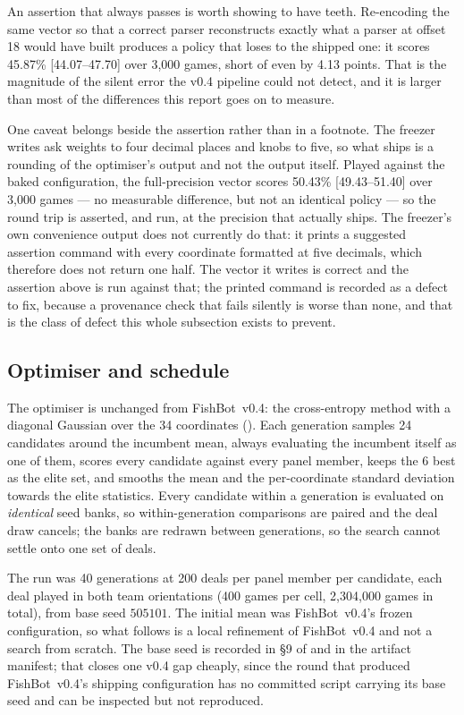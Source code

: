 \documentclass[11pt]{article}
\theoremstyle{definition}
\DeclareRobustCommand{\vfour}{\texorpdfstring{\mbox{FishBot v0.4}}{FishBot v0.4}}
\providecommand{\numFitGens}{40}
\providecommand{\numFitDims}{34}
\providecommand{\numAliasOffset}{18}
\providecommand{\numAliasWin}{45.87}
\providecommand{\numAliasCI}{44.07--47.70}
\providecommand{\numAliasLoss}{4.13}
\providecommand{\numAliasGames}{3{,}000}
\providecommand{\numQuantWin}{50.43}
\providecommand{\numQuantCI}{49.43--51.40}
\providecommand{\numQuantGames}{3{,}000}
\providecommand{\numFitPop}{24}
\providecommand{\numFitElite}{6}
\providecommand{\numFitSeed}{505101}
\providecommand{\numFitDeals}{200}
\providecommand{\numFitCellGames}{400}
\providecommand{\numFitTotalGames}{2{,}304{,}000}
\begin{document}
An assertion that always passes is worth showing to have teeth. Re-encoding the
same vector so that a correct parser reconstructs exactly what a parser at offset
\numAliasOffset{} would have built produces a policy that loses to the shipped
one: it scores \numAliasWin\% [\numAliasCI] over \numAliasGames{} games, short of
even by \numAliasLoss{} points. That is the magnitude of the silent error the
v0.4 pipeline could not detect, and it is larger than most of the differences
this report goes on to measure.

One caveat belongs beside the assertion rather than in a footnote. The freezer
writes ask weights to four decimal places and knobs to five, so what ships is a
rounding of the optimiser's output and not the output itself. Played against the
baked configuration, the full-precision vector scores \numQuantWin\%
[\numQuantCI] over \numQuantGames{} games --- no measurable difference, but not
an identical policy --- so the round trip is asserted, and run, at the precision
that actually ships. The freezer's own convenience output does not currently do
that: it prints a suggested assertion command with every coordinate formatted at
five decimals, which therefore does not return one half. The vector it writes is
correct and the assertion above is run against that; the printed command is
recorded as a defect to fix, because a provenance check that fails silently is
worse than none, and that is the class of defect this whole subsection exists to
prevent.

\subsection{Optimiser and schedule}
\label{sec:fit-cem}

The optimiser is unchanged from \vfour{}: the cross-entropy method with a
diagonal Gaussian over the \numFitDims{} coordinates
(). Each generation samples \numFitPop{}
candidates around the incumbent mean, always evaluating the incumbent itself as
one of them, scores every candidate against every panel member, keeps the
\numFitElite{} best as the elite set, and smooths the mean and the
per-coordinate standard deviation towards the elite statistics. Every candidate
within a generation is evaluated on \emph{identical} seed banks, so
within-generation comparisons are paired and the deal draw cancels; the banks are
redrawn between generations, so the search cannot settle onto one set of deals.

The run was \numFitGens{} generations at \numFitDeals{} deals per panel member
per candidate, each deal played in both team orientations
(\numFitCellGames{} games per cell, \numFitTotalGames{} games in total), from
base seed $\numFitSeed$. The initial mean was \vfour{}'s frozen configuration, so
what follows is a local refinement of \vfour{} and not a search from scratch.
The base seed is recorded in \S9 of  and in the
artifact manifest; that closes one v0.4 gap cheaply, since the round that
produced \vfour{}'s shipping configuration has no committed script carrying its
base seed and can be inspected but not reproduced.
\end{document}
